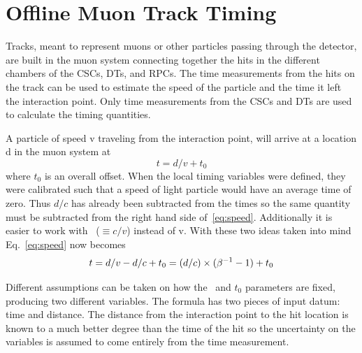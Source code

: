 \section{Offline Muon Track Timing}

Tracks, meant to represent muons or other particles passing through the detector, are built in the muon system connecting together the hits in the different chambers of
the CSCs, DTs, and RPCs. The time measurements from the hits on the track can be used to estimate the speed of the particle and the time it left the interaction point.
Only time measurements from the CSCs and DTs are used to calculate the timing quantities.

A particle of speed v traveling from the interaction point, will arrive at a location d in the muon system at
\begin{equation}
t = d/v + t_0
\label{eq:speed}
\end{equation}
where $t_0$ is an overall offset. When the local timing variables were defined, they were calibrated such that a speed of light particle would have an average time
of zero. Thus $d/c$ has already been subtracted from the times so the same quantity must be subtracted from the right hand side of~\ref{eq:speed}.
Additionally it is easier to work with \invbeta\ ($\equiv{c/v}$) instead of v. With these two ideas taken into mind Eq.~\ref{eq:speed} now becomes
\begin{equation}
t = d/v - d/c + t_0 = (d / c) \times (\beta^{-1} - 1) + t_0 \\
\label{eq:speedred}
\end{equation}

Different assumptions can be taken on how the \invbeta\ and $t_0$ parameters are fixed, producing two different variables.
The formula has two pieces of input datum: time and distance. The distance
from the interaction point to the hit location is known to a much better degree than the time of the hit so the uncertainty on the variables
is assumed to come entirely from the time measurement.

